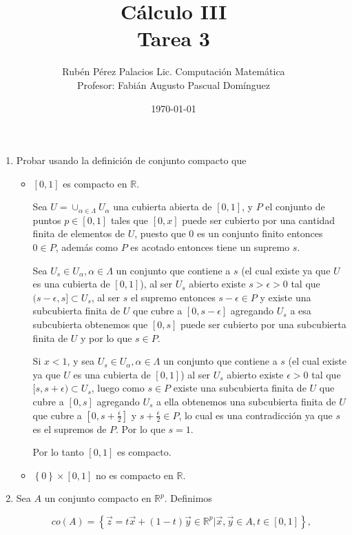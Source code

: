 \documentclass[letterpaper]{article}
\title{Cálculo III \\ Tarea 3}
\author{Rubén Pérez Palacios Lic. Computación Matemática\\Profesor: Fabián Augusto Pascual Domínguez}
\date{\today}
\theoremstyle{definition}
\theoremstyle{lemathm}
\theoremstyle{lemathm}
\theoremstyle{lemathm}
\theoremstyle{lemademthm}
\newcommand{\bracs}[1]{\left[ #1 \right] }
\newcommand{\set}[1]{\left \{ #1 \right\} }
\newcommand{\RR}{\mathbb{R}}
\newcommand{\1}{\mathbbm{1}}
\begin{document}
	\maketitle

	\begin{enumerate}
		
		\item Probar usando la definición de conjunto compacto que
		
		\begin{itemize}
			\item $\bracs{0,1}$ es compacto en $\RR$.
			
			Sea $U = \cup_{\alpha \in \Lambda} U_{\alpha}$ una cubierta abierta de $\bracs{0,1}$, y $P$ el conjunto de puntos $p\in \bracs{0,1}$ tales que $\bracs{0,x}$ puede ser cubierto por una cantidad finita de elementos de $U$, puesto que ${0}$ es un conjunto finito entonces $0\in P$, además como $P$ es acotado entonces tiene un supremo $s$. 
			
			Sea $U_s\in {U_{\alpha}, \alpha\in\Lambda}$ un conjunto que contiene a $s$ (el cual existe ya que $U$ es una cubierta de $\bracs{0,1}$), al ser $U_s$ abierto existe $s > \epsilon > 0$ tal que $(s-\epsilon,s]\subset U_s$, al ser $s$ el supremo entonces $s-\epsilon \in P$ y existe una subcubierta finita de $U$ que cubre a $\bracs{0,s-\epsilon}$ agregando $U_s$ a esa subcubierta obtenemos que $\bracs{0,s}$ puede ser cubierto por una subcubierta finita de $U$ y por lo que $s\in P$. 
			
			Si $x < 1$, y sea $U_s\in {U_{\alpha}, \alpha\in\Lambda}$ un conjunto que contiene a $s$ (el cual existe ya que $U$ es una cubierta de $\bracs{0,1}$) al ser $U_s$ abierto existe $\epsilon > 0$ tal que $[s, s+\epsilon)\subset U_s$, luego como $s\in P$ existe una subcubierta finita de $U$ que cubre a $\bracs{0,s}$ agregando $U_s$ a ella obtenemos una subcubierta finita de $U$ que cubre a $[0,s+\frac{\epsilon}{2}]$ y $s+\frac{\epsilon}{2}\in P$, lo cual es una contradicción ya que $s$ es el supremos de $P$. Por lo que $s = 1$.

			Por lo tanto $\bracs{0,1}$ es compacto.

			\item $\set{0}\times\bracs{0,1}$ no es compacto en $\RR$.
		\end{itemize}

		\item Sea $A$ un conjunto compacto en $\RR^p$. Definimos
		
		\[co(A) = \set{\vec{z} = t\vec{x} + (1-t)\vec{y} \in \RR^p | \vec{x},\vec{y}\in A, t\in\bracs{0,1}},\]


\end{enumerate}
\end{document}
